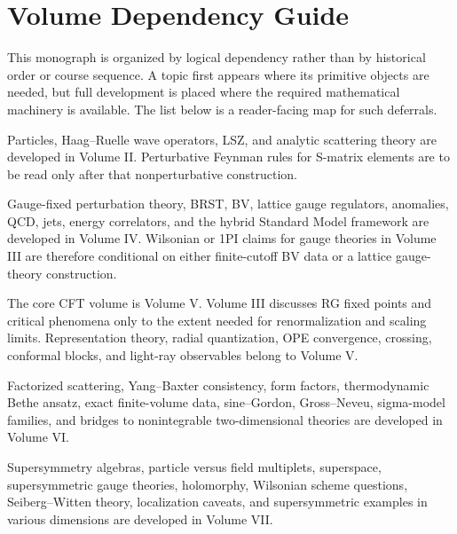 \chapter*{Volume Dependency Guide}

This monograph is organized by logical dependency rather than by historical
order or course sequence.  A topic first appears where its primitive objects
are needed, but full development is placed where the required mathematical
machinery is available.  The list below is a reader-facing map for such
deferrals.

\begin{description}[leftmargin=2.7em,style=nextline]
\item[Scattering before perturbative amplitudes]
Particles, Haag--Ruelle wave operators, LSZ, and analytic scattering theory
are developed in Volume II.  Perturbative Feynman rules for S-matrix elements
are to be read only after that nonperturbative construction.

\item[Gauge theory and effective actions]
Gauge-fixed perturbation theory, BRST, BV, lattice gauge regulators,
anomalies, QCD, jets, energy correlators, and the hybrid Standard Model
framework are developed in Volume IV.  Wilsonian or 1PI claims for gauge
theories in Volume III are therefore conditional on either finite-cutoff BV
data or a lattice gauge-theory construction.

\item[Conformal fixed points]
The core CFT volume is Volume V.  Volume III discusses RG fixed points and
critical phenomena only to the extent needed for renormalization and scaling
limits.  Representation theory, radial quantization, OPE convergence,
crossing, conformal blocks, and light-ray observables belong to Volume V.

\item[Two-dimensional exact QFT]
Factorized scattering, Yang--Baxter consistency, form factors,
thermodynamic Bethe ansatz, exact finite-volume data, sine--Gordon,
Gross--Neveu, sigma-model families, and bridges to nonintegrable
two-dimensional theories are developed in Volume VI.

\item[Supersymmetry]
Supersymmetry algebras, particle versus field multiplets, superspace,
supersymmetric gauge theories, holomorphy, Wilsonian scheme questions,
Seiberg--Witten theory, localization caveats, and supersymmetric examples in
various dimensions are developed in Volume VII.


\end{description}
